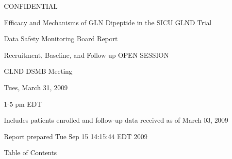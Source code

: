 \documentclass[dvips,10pt]{article}
\begin{document}
\vspace*{1in}
\begin{center}
{\Huge{CONFIDENTIAL}}
\end{center}
\vspace*{0.5in}
\begin{center}
{\Huge{Efficacy and Mechanisms of GLN Dipeptide in the SICU GLND Trial}}
\end{center}
\vspace*{0.5in}
\begin{center}
{\Huge{Data Safety Monitoring Board Report}}
\end{center}
\vspace*{0.25in}
\begin{center}
{\Huge{
Recruitment, Baseline, and Follow-up  OPEN SESSION
}}
\end{center}
\vspace*{1in}
\begin{center}
{\Huge{GLND DSMB Meeting}}
\end{center}
\begin{center}
{\Huge{
 Tues, March 31, 2009
}}
\end{center}
\begin{center}
{\Huge{1-5 pm EDT}}
\end{center}
\vspace*{1in}
\begin{center}
\noindent
{\Large{Includes patients enrolled and follow-up data received as of March 03, 2009}}
\end{center}
\vspace*{0.5in}
\begin{center}
{\Large{Report prepared  Tue Sep 15 14:15:44 EDT 2009 }}
\end{center}
\clearpage
\vspace*{1in}
\begin{center}
{\Huge{Table of Contents}}
\end{center}
\listoftables
\listoffigures
\clearpage
\clearpage
\end{document}
